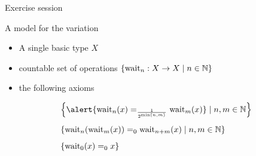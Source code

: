 \documentclass{beamer}
\begin{document}
\begin{frame}{Exercise session}

        A model for the variation
        \begin{itemize}
                \item A single basic type $X$
                        \\[7pt]
                \item countable set of operations $\left \{ \text{wait}_n : X \to X \mid n \in \mathbb{N} \right \}$
                        \\[7pt]
                \item the following axioms
        \end{itemize}
        \vspace{-0.4cm}
        \begin{align*}
                & \left \{ 
                \alert{ \text{wait}_n(x) =_{\frac{1}{2^{\min(n,m)}}} \text{wait}_m(x)} \mid n,m \in \Nats \right \}
                \\[5pt]
                & \left \{ \text{wait}_n(\text{wait}_m(x)) =_0 \text{wait}_{n+m}(x) \mid n,m \in \Nats \right \}
                \\[5pt]
                & \left \{ \text{wait}_0(x) =_0 x \right \} 
        \end{align*}

\end{frame}
\end{document}
